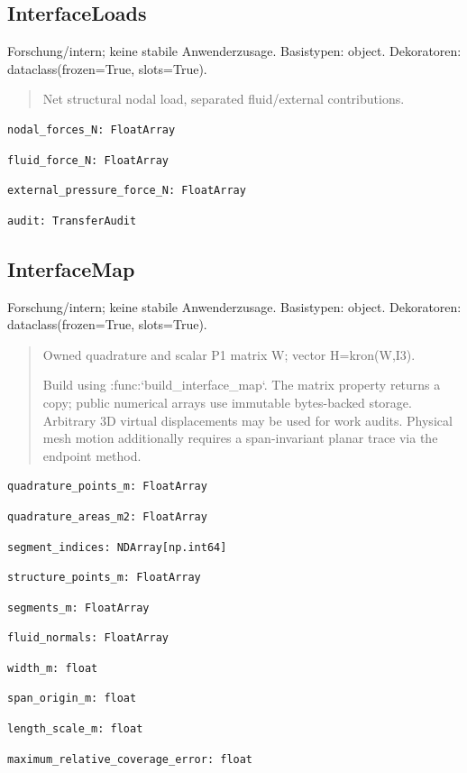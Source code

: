 \subsection{InterfaceLoads}
Forschung/intern; keine stabile Anwenderzusage.
Basistypen: object. Dekoratoren: dataclass(frozen=True, slots=True).
\begin{quote}
Net structural nodal load, separated fluid/external contributions.
\end{quote}
\begin{lstlisting}
nodal_forces_N: FloatArray
\end{lstlisting}
\begin{lstlisting}
fluid_force_N: FloatArray
\end{lstlisting}
\begin{lstlisting}
external_pressure_force_N: FloatArray
\end{lstlisting}
\begin{lstlisting}
audit: TransferAudit
\end{lstlisting}
\subsection{InterfaceMap}
Forschung/intern; keine stabile Anwenderzusage.
Basistypen: object. Dekoratoren: dataclass(frozen=True, slots=True).
\begin{quote}
Owned quadrature and scalar P1 matrix W; vector H=kron(W,I3).\par Build using :func:`build\_interface\_map`. The matrix property returns a copy; public numerical arrays use immutable bytes-backed storage. Arbitrary 3D virtual displacements may be used for work audits. Physical mesh motion additionally requires a span-invariant planar trace via the endpoint method.
\end{quote}
\begin{lstlisting}
quadrature_points_m: FloatArray
\end{lstlisting}
\begin{lstlisting}
quadrature_areas_m2: FloatArray
\end{lstlisting}
\begin{lstlisting}
segment_indices: NDArray[np.int64]
\end{lstlisting}
\begin{lstlisting}
structure_points_m: FloatArray
\end{lstlisting}
\begin{lstlisting}
segments_m: FloatArray
\end{lstlisting}
\begin{lstlisting}
fluid_normals: FloatArray
\end{lstlisting}
\begin{lstlisting}
width_m: float
\end{lstlisting}
\begin{lstlisting}
span_origin_m: float
\end{lstlisting}
\begin{lstlisting}
length_scale_m: float
\end{lstlisting}
\begin{lstlisting}
maximum_relative_coverage_error: float
\end{lstlisting}
